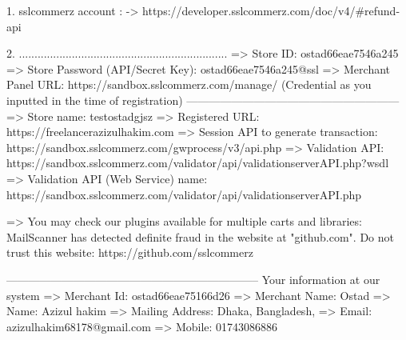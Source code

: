 1. sslcommerz account : 
   -> https://developer.sslcommerz.com/doc/v4/#refund-api

2. ...................................................................
   => Store ID: ostad66eae7546a245
   => Store Password (API/Secret Key): ostad66eae7546a245@ssl
   => Merchant Panel URL: https://sandbox.sslcommerz.com/manage/ (Credential as you inputted in the time of     registration)
---------------------------------------------------------
=> Store name: testostadgjsz
=> Registered URL: https://freelancerazizulhakim.com
=> Session API to generate transaction: https://sandbox.sslcommerz.com/gwprocess/v3/api.php
=> Validation API: https://sandbox.sslcommerz.com/validator/api/validationserverAPI.php?wsdl
=> Validation API (Web Service) name: https://sandbox.sslcommerz.com/validator/api/validationserverAPI.php
 
=> You may check our plugins available for multiple carts and libraries: MailScanner has detected definite fraud in the website at "github.com". Do not trust this website: https://github.com/sslcommerz

--------------------------------------------------------------------
Your information at our system
=> Merchant Id: ostad66eae75166d26
=> Merchant Name: Ostad
=> Name: Azizul hakim
=> Mailing Address: Dhaka, Bangladesh,
=> Email: azizulhakim68178@gmail.com
=> Mobile: 01743086886